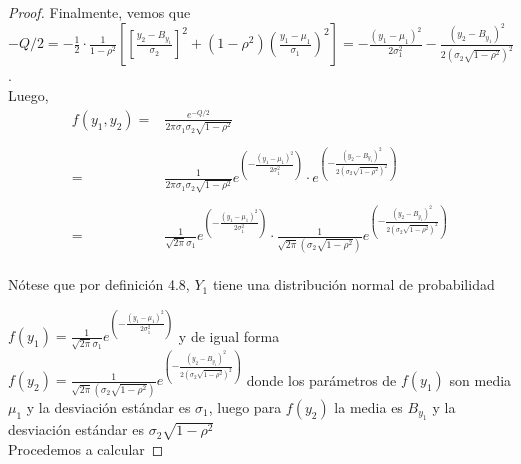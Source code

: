 \documentclass[a4paper,12pt]{article}
\begin{document}
\begin{proof}
    Finalmente, vemos que $-Q/2 =\displaystyle -\frac{1}{2} \cdot \frac{1}{1-\rho^2} \left[ \left[ \frac{y_2-B_{y_1}}{\sigma_2}\right]^2 + (1-\rho^2) \displaystyle \left( \frac{y_1-\mu_1}{\sigma_1} \right)^2 \right] = -\frac{(y_1-\mu_1)^2}{2\sigma_1^2} - \frac{(y_2-B_{y_1})^2}{2(\sigma_2\sqrt{1-\rho^2})^2}$.\\
    
    Luego,
    \[
    \begin{array}{rl}
        f(y_1,y_2) = & \displaystyle \frac{e^{-Q/2}}{2\pi\sigma_1\sigma_2\sqrt{1-\rho^2}}  \\\\
          = & \displaystyle\frac{1}{2\pi\sigma_1\sigma_2\sqrt{1-\rho^2}} e^{\left(\displaystyle-\frac{(y_1-\mu_1)^2}{2\sigma_1^2}\right)}\cdot e^{\left(\displaystyle  - \frac{(y_2-B_{y_1})^2}{2(\sigma_2\sqrt{1-\rho^2})^2}\right)} \\\\
          = & \displaystyle\frac{1}{\sqrt{2\pi}\sigma_1} e^{\left(\displaystyle-\frac{(y_1-\mu_1)^2}{2\sigma_1^2}\right)} \cdot  \frac{1}{\sqrt{2\pi}(\sigma_2\sqrt{1-\rho^2})} e^{\left(\displaystyle  - \frac{(y_2-B_{y_1})^2}{2(\sigma_2\sqrt{1-\rho^2})^2}\right)}
    \end{array}
    \]
     \\
    Nótese que por definición 4.8, $Y_1$ tiene una distribución normal de probabilidad 
    
    $f(y_1) = \displaystyle\frac{1}{\sqrt{2\pi}\sigma_1} e^{\left(\displaystyle-\frac{(y_1-\mu_1)^2}{2\sigma_1^2}\right)}$ y de igual forma $f(y_2) = \displaystyle \frac{1}{\sqrt{2\pi}(\sigma_2\sqrt{1-\rho^2})} e^{\left(\displaystyle  - \frac{(y_2-B_{y_1})^2}{2(\sigma_2\sqrt{1-\rho^2})^2}\right)}$ donde los parámetros de $f(y_1)$ son media $\mu_1$ y la desviación estándar es $\sigma_1$, luego para $f(y_2)$ la media es $B_{y_1}$ y la desviación estándar es $\sigma_2\sqrt{1-\rho^2}$\\
    
    Procedemos a calcular 
    

\end{proof}
\end{document}
